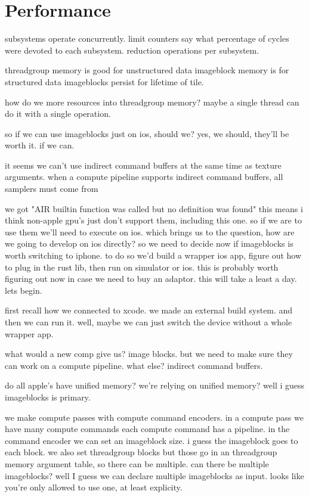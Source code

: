 
\section{Performance}
subsystems operate concurrently. limit counters say what percentage of cycles were devoted to each subsystem.
reduction operations per subsystem.


threadgroup memory is good for unstructured data
imageblock memory is for structured data
imageblocks persist for lifetime of tile.

how do we more resources into threadgroup memory?
maybe a single thread can do it with a single operation.

so if we can use imageblocks just on ios, should we? yes, we should, they'll be worth it. if we can.

it seems we can't use indirect command buffers at the same time as texture arguments. 
when a compute pipeline supports indirect command buffers, all samplers must come from 

we got "AIR builtin function was called but no definition was found" 
this means i think non-apple gpu's just don't support them, including this one.
so if we are to use them we'll need to execute on ios. 
which brings us to the question, how are we going to develop on ios directly?
so we need to decide now if imageblocks is worth switching to iphone. to do so we'd build a wrapper ios app, figure out how to plug in the rust lib, then run on simulator or ios.
this is probably worth figuring out now in case we need to buy an adaptor. this will take a least a day. lets begin. 


first recall how we connected to xcode. we made an external build system. and then we can run it. well, maybe we can just switch the device without a whole wrapper app. 

what would a new comp give us?
image blocks. but we need to make sure they can work on a compute pipeline.
what else? indirect command buffers. 


do all apple's have unified memory?
we're relying on unified memory?
well i guess imageblocks is primary. 

we make compute passes with compute command encoders. 
in a compute pass we have many compute commands
each compute command has a pipeline. 
in the command encoder we can set an imageblock size. 
i guess the imageblock goes to each block.
we also set threadgroup blocks but those go in an threadgroup memory argument table, so there can be multiple.
can there be multiple imageblocks? well I guess we can declare multiple imageblocks as input. 
looks like you're only allowed to use one, at least explicity. 

